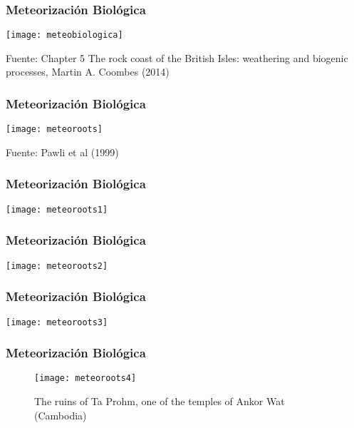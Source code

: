\documentclass{beamer}
\begin{document}
\begin{frame}
\frametitle{Meteorización Biológica}
\begin{center}
   	\texttt{[image: meteobiologica]}
\end{center}
\tiny{Fuente: Chapter 5 The rock coast of the British Isles: weathering and biogenic processes, Martin A. Coombes (2014)}
\end{frame}
\begin{frame}
\frametitle{Meteorización Biológica}
\begin{center}
   	\texttt{[image: meteoroots]}
\end{center}
\tiny{Fuente: Pawli et al (1999)}
\end{frame}
\begin{frame}
\frametitle{Meteorización Biológica}
\begin{center}
   	\texttt{[image: meteoroots1]}
\end{center}
\end{frame}
\begin{frame}
\frametitle{Meteorización Biológica}
\begin{center}
   	\texttt{[image: meteoroots2]}
\end{center}
\end{frame}
\begin{frame}
\frametitle{Meteorización Biológica}
\begin{center}
   	\texttt{[image: meteoroots3]}
\end{center}
\end{frame}
\begin{frame}
\frametitle{Meteorización Biológica}
\begin{figure}
\begin{center}
   	\texttt{[image: meteoroots4]}
\end{center}
\caption{The ruins of Ta Prohm, one of the temples of Ankor Wat (Cambodia)}
\end{figure}
\end{frame}
\end{document}
